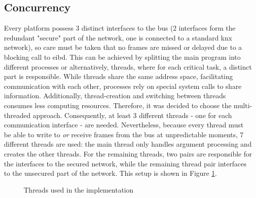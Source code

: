 \subsection{Concurrency}
Every platform possess 3 distinct interfaces to the bus (2 interfaces form the redundant "secure" part of the network, one is connected
to a standard \gls{knx} network), so care must be taken that no frames are missed or delayed due to a blocking call to \gls{eibd}. This can be achieved by splitting the main program into different 
processes or alternatively, threads, where for each critical task, a distinct part is responsible. While threads share the same address space, facilitating communication with
each other, processes rely on special system calls 
to share information. Additionally, thread-creation and switching between threads consumes less computing resources. Therefore, it was decided to choose the multi-threaded
approach. Consequently, at least 3 different threads - one for each communication interface - are needed. Nevertheless, because every thread must be able to write to \textit{or} receive
frames from the bus at unpredictable moments, 7 different threads are used: the main thread only handles argument processing and creates the other threads. For the remaining threads,
two pairs are responsible for the interfaces to the secured network, while the remaining thread pair interfaces to the unsecured part of the network. This setup is shown in
Figure \ref{fig:Concthreads}.
\begin{figure}[h]
\centering
{}
\caption{Threads used in the implementation}
\label{fig:Concthreads}
\end{figure}

